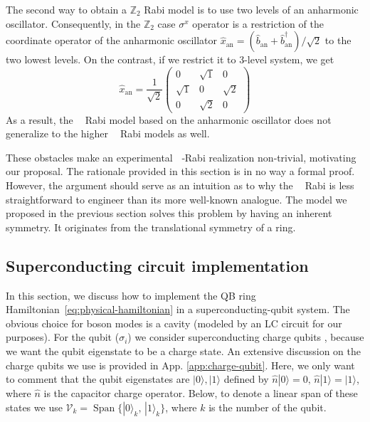 \documentclass[reprint, aps, prx, amsmath, amssymb, longbibliography, superscriptaddress]{revtex4-2}
\DeclareMathOperator{\Zn}{\mathbb{Z}_n}
\DeclareMathOperator{\Zthree}{\mathbb{Z}_3}
\DeclareMathOperator{\Ztwo}{\mathbb{Z}_2}
\begin{document}
The second way to obtain a $\mathbb{Z}_2$ Rabi model is to use two levels of an anharmonic oscillator. Consequently, in the $\mathbb{Z}_2$ case $\sigma^x$ operator is a restriction of the coordinate operator of the anharmonic oscillator $ \hat x_{\text{an}} = (\hat b_{\text{an}} + \hat b_{\text{an}}^{\dagger})/\sqrt{2} $ to the two lowest levels. On the contrast, if we restrict it to 3-level system, we get
\begin{equation}
    \hat x_{\text{an}} = \frac{1}{\sqrt{2}}\begin{pmatrix} 0 & \sqrt{1} & 0 \\ \sqrt{1} & 0 & \sqrt{2} \\ 0 & \sqrt{2} & 0 \end{pmatrix}
\end{equation}
As a result, the $\Ztwo$ Rabi model based on the anharmonic oscillator does not generalize to the higher $\Zn$ Rabi models as well.

These obstacles make an experimental $\Zn$‑Rabi realization non‑trivial, motivating our proposal. The rationale provided in this section is in no way a formal proof. However, the argument should serve as an intuition as to why the $\Zthree$ Rabi is less straightforward to engineer than its more well-known analogue. The model we proposed in the previous section solves this problem by having an inherent $\Zthree$ symmetry. It originates from the translational symmetry of a ring.

\subsection{Superconducting circuit implementation}
\label{sec:superconducting-implementation}

In this section, we discuss how to implement the QB ring Hamiltonian~\eqref{eq:physical-hamiltonian} in a superconducting-qubit system. The obvious choice for boson modes is a cavity (modeled by an LC circuit for our purposes). For the qubit ($\sigma_i$)  we consider superconducting charge qubits \cite{bouchiat_quantum_1998,nakamura_coherent_1999,lehnert_measurement_2003,makhlin_quantumstate_2001}, because we want the qubit eigenstate to be a charge state. An extensive discussion on the charge qubits we use is provided in App. \ref{app:charge-qubit}. Here, we only want to comment that the qubit eigenstates are $|0\rangle, |1\rangle$ defined by $\hat n |0\rangle = 0, \, \hat n |1\rangle = |1\rangle$, where $\hat n$ is the capacitor charge operator. Below, to denote a linear span of these states we use $\mathcal{V}_k = \operatorname{Span}\{|0\rangle_k, \, |1\rangle_k\}$, where $k$ is the number of the qubit.
\end{document}

